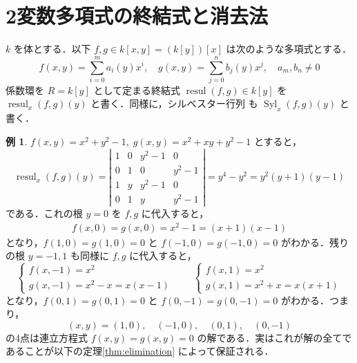\documentclass[12pt, uplatex, dvipdfmx]{jsarticle}
\theoremstyle{definition}
\newtheorem{example}{例}
\newtheorem*{remark}{注意}
\DeclareMathOperator{\Syl}{Syl}
\DeclareMathOperator{\resul}{resul}
\begin{document}



\section{2変数多項式の終結式と消去法}

$k$ を体とする．以下 $f, g \in k[x,y] = \left( k\left[ y\right]\right)[x]$ は次のような多項式とする．
\[
  f(x,y) = \sum_{i=0}^{m} a_i(y) x^i, \quad  g(x,y) = \sum_{j=0}^{n} b_j(y) x^j, \quad a_m, b_n \neq 0
\]
係数環を $R=k[y]$ として定まる終結式 $\resul(f,g) \in
k[y]$ を $\resul_x(f,g)(y)$ と書く．同様に，シルベスター行列
も $\Syl_x(f,g)(y)$ と書く．

\begin{example}
  $f(x,y)=x^2+y^2-1,\;  g(x,y)=x^2+xy+y^2-1$ とすると，
  \[
    \resul_x(f,g)(y) = \left|
      \begin{array}{cccc}
        1 & 0 & y^2-1 & 0\\
        0 & 1 & 0 & y^2-1\\
        1 & y & y^2-1 & 0\\
        0 & 1 & y & y^2-1
      \end{array}
    \right| = y^4-y^2 = y^2(y+1)(y-1)
  \]
  である．これの根 $y=0$ を $f,g$ に代入すると，
  \[
    \begin{aligned}
      f(x,0) = g(x,0) = x^2-1 = (x+1)(x-1)
    \end{aligned}
  \]
  となり，$f(1, 0) = g(1, 0) = 0$ と $f(-1,0)=g(-1,0)=0$ がわかる．残り
  の根 $y=-1, 1$ も同様に $f,g$ に代入すると，
  \[
    \begin{cases}
      f(x,-1) = x^2\\
      g(x,-1) = x^2-x=x(x-1)
    \end{cases} \qquad
    \begin{cases}
      f(x,1) = x^2\\
      g(x,1) = x^2+x=x(x+1)
    \end{cases}
  \]
  となり，$f(0, 1) = g(0, 1)=0$ と $f(0,-1)=g(0,-1)=0$ がわかる．つまり，
  \[
    (x,y) = (1,0), \quad (-1,0), \quad (0,1), \quad (0,-1)
  \]
  の4点は連立方程式 $f(x,y)=g(x,y)=0$ の解である．実はこれが解の全てで
  あることが以下の定理\ref{thm:elimination} によって保証される．
\end{example}
\end{document}
